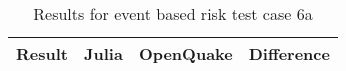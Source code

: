 \begin{table}[htbp]

\centering
\begin{tabular}{ l r r r }

\hline
\rowcolor{anti-flashwhite}
\bf{Result} & \bf{Julia} & \bf{OpenQuake} & \bf{Difference}\\
\hline

\hline
\end{tabular}

\caption{Results for event based risk test case 6a}
\label{tab:result-ebr-6a}
\end{table}